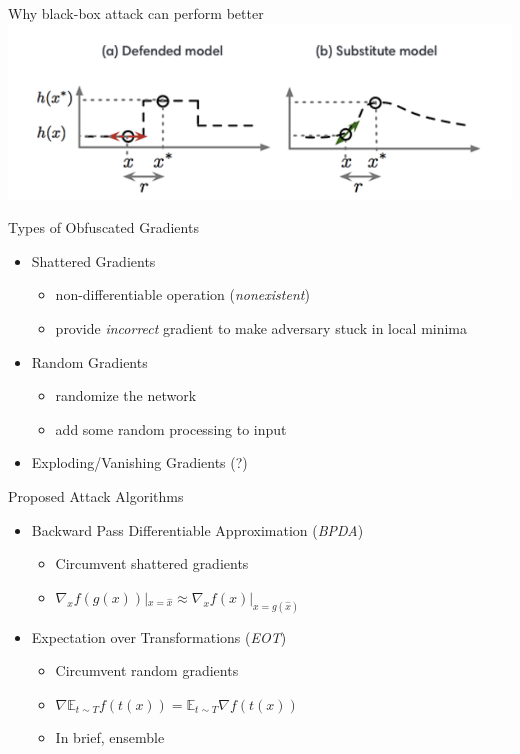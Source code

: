 \documentclass{beamer}
\begin{document}
\begin{frame}{Why black-box attack can perform better}
  \includegraphics[width=\textwidth]{fig/ob-grad/black-box-attack.png}
\end{frame}

\begin{frame}{Types of Obfuscated Gradients}
  \begin{itemize}
    \item Shattered Gradients 
      \begin{itemize}
        \item non-differentiable operation (\textit{nonexistent})
        \item provide \textit{incorrect} gradient to make adversary stuck in local minima
      \end{itemize}
    \item Random Gradients
        \begin{itemize}
          \item randomize the network
          \item add some random processing to input
        \end{itemize}
      \item Exploding/Vanishing Gradients (?)
  \end{itemize}
\end{frame}

\begin{frame}{Proposed Attack Algorithms}
  \begin{itemize}
    \item Backward Pass Differentiable Approximation (\textit{BPDA})
      \begin{itemize}
        \item Circumvent shattered gradients
        \item $\nabla_xf(g(x))|_{x = \hat{x}} \approx \nabla_xf(x)|_{x = g(\hat{x})}$
      \end{itemize}

    \item Expectation over Transformations (\textit{EOT})
      \begin{itemize}
        \item Circumvent random gradients
        \item $\nabla\mathbb{E}_{t \sim T}f(t(x)) = \mathbb{E}_{t \sim T} \nabla f(t(x))$
        \item In brief, ensemble
      \end{itemize}
  \end{itemize}
\end{frame}
\end{document}
